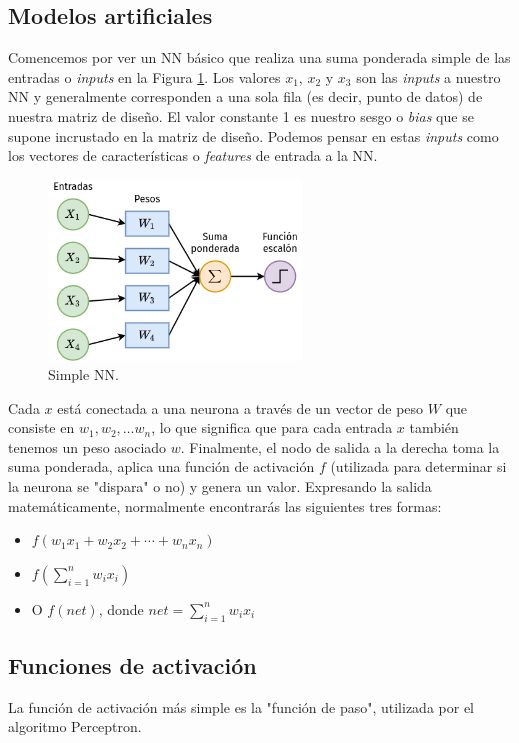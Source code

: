 \documentclass[a4paper,12pt]{article}
\begin{document}
\subsection{Modelos artificiales}
Comencemos por ver un NN básico que realiza una suma ponderada simple de las entradas o \textit{inputs} en la Figura \ref{fig:simplenn}. Los valores $x_1$, $x_2$ y $x_3$ son las \textit{inputs} a nuestro NN y generalmente corresponden a una sola fila (es decir, punto de datos) de nuestra matriz de diseño. El valor constante 1 es nuestro sesgo o \textit{bias} que se supone incrustado en la matriz de diseño. Podemos pensar en estas \textit{inputs} como los vectores de características o \textit{features} de entrada a la NN.

\begin{figure}[H]
	\begin{center}				
		\includegraphics[width=0.6\textwidth]{020.png}
		\caption{Simple NN.}
		\label{fig:simplenn}
	\end{center}
\end{figure}

Cada $x$ está conectada a una neurona a través de un vector de peso $W$ que consiste en $w_1, w_2, \ldots w_n$, lo que significa que para cada entrada $x$ también tenemos un peso asociado $w$.
Finalmente, el nodo de salida a la derecha toma la suma ponderada, aplica una función de activación $f$ (utilizada para determinar si la neurona se "dispara" o no) y genera un valor. Expresando la salida matemáticamente, normalmente encontrarás las siguientes tres formas:
\begin{itemize}[noitemsep, topsep=2pt]
	\item $f(w_1x_1 + w_2x_2 + \cdots + w_nx_n)$
	\item $f(\sum_{i=1}^{n} w_ix_i)$	
	\item O $f(net)$, donde $net = \sum_{i=1}^{n} w_ix_i$
\end{itemize}

\subsection{Funciones de activación}
La función de activación más simple es la "función de paso", utilizada por el algoritmo Perceptron.
\end{document}
